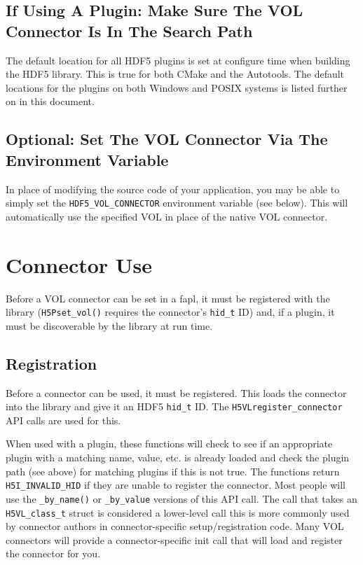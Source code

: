 \subsection{If Using A Plugin: Make Sure The VOL Connector Is In The Search Path}

The default location for all HDF5 plugins is set at configure time when building the HDF5 library. This is true for both CMake and the Autotools. The default locations for the plugins on both Windows and POSIX systems is listed further on in this document.

\subsection{Optional: Set The VOL Connector Via The Environment Variable}

In place of modifying the source code of your application, you may be able to simply set the {\tt HDF5\_VOL\_CONNECTOR} environment variable (see below). This will automatically use the specified VOL in place of the native VOL connector.

\section{Connector Use}

Before a VOL connector can be set in a fapl, it must be registered with the library ({\tt H5Pset\_vol()} requires the connector's {\tt hid\_t} ID) and, if a plugin, it must be discoverable by the library at run time.

\subsection{Registration}

Before a connector can be used, it must be registered. This loads the connector into the library and give it an HDF5 {\tt hid\_t} ID. The {\tt H5VLregister\_connector} API calls are used for this.

\quad{}

\quad{}

\quad{}

When used with a plugin, these functions will check to see if an appropriate plugin with a matching name, value, etc. is already loaded and check the plugin path (see above) for matching plugins if this is not true. The functions return {\tt H5I\_INVALID\_HID} if they are unable to register the connector. Most people will use the {\tt \_by\_name()} or {\tt \_by\_value} versions of this API call. The call that takes an {\tt H5VL\_class\_t} struct is considered a lower-level call this is more commonly used by connector authors in connector-specific setup/registration code. Many VOL connectors will provide a connector-specific init call that will load and register the connector for you.

